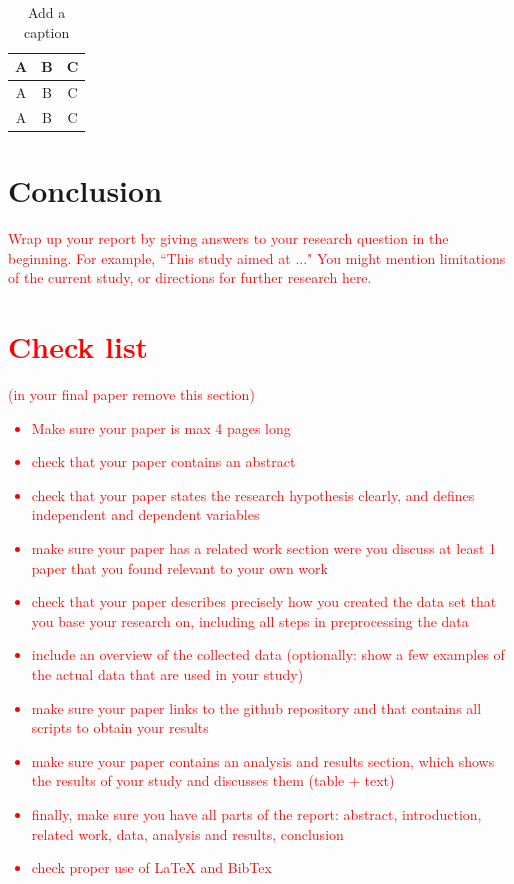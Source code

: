 \documentclass[11pt]{article}
\begin{document}
\begin{table}[hbtp]\centering
\begin{tabular}{|ccc|}
\hline
A & B & C\\
\hline
A & B & C\\
A & B & C\\
\hline
\end{tabular}
\caption{Add a caption}
\label{tbl:results}
\end{table}

\section{Conclusion}

\textcolor{red}{Wrap up your report by giving answers to your research question in the beginning. For example, ``This study aimed at ..." You might mention limitations of the current study, or directions for further research here.}


\section*{\textcolor{red}{Check list}}
\textcolor{red}{(in your final paper remove this section)}
\textcolor{red}{
\begin{itemize}
\item Make sure your paper is max 4 pages long
\item check that your paper contains an abstract
\item check that your paper states the research hypothesis
clearly, and defines independent and dependent variables
\item make sure your paper has a related work section were you discuss at least 1 paper that you found relevant to your own work
\item check that your paper describes precisely how you created
the data set that you base your research on, including all steps in preprocessing the data
\item include an overview of the collected data (optionally: show a few examples of the actual data that are used in your study)
\item make sure your paper links to the github repository and that contains all scripts to obtain your results
\item make sure your paper contains an analysis and results section, which shows the results of your study and discusses them (table + text)
\item finally, make sure you have all parts of the report: abstract, introduction, related work, data, analysis and results, conclusion
\item check proper use of \LaTeX{} and BibTex
\end{itemize}
}



\end{document}
